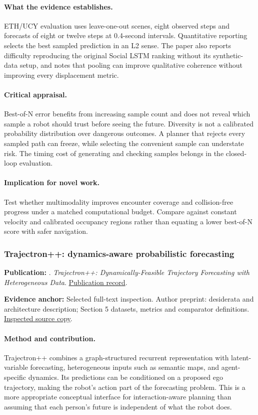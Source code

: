 \paragraph{What the evidence establishes.} ETH/UCY evaluation uses leave-one-out scenes, eight observed steps and forecasts of eight or twelve steps at 0.4-second intervals. Quantitative reporting selects the best sampled prediction in an L2 sense. The paper also reports difficulty reproducing the original Social LSTM ranking without its synthetic-data setup, and notes that pooling can improve qualitative coherence without improving every displacement metric.

\paragraph{Critical appraisal.} Best-of-N error benefits from increasing sample count and does not reveal which sample a robot should trust before seeing the future. Diversity is not a calibrated probability distribution over dangerous outcomes. A planner that rejects every sampled path can freeze, while selecting the convenient sample can understate risk. The timing cost of generating and checking samples belongs in the closed-loop evaluation.

\paragraph{Implication for novel work.} Test whether multimodality improves encounter coverage and collision-free progress under a matched computational budget. Compare against constant velocity and calibrated occupancy regions rather than equating a lower best-of-N score with safer navigation.

\subsubsection{Trajectron++: dynamics-aware probabilistic forecasting}\label{paper:trajectron}
\textbf{Publication:} \citet{trajectron}. \emph{Trajectron++: Dynamically-Feasible Trajectory Forecasting with Heterogeneous Data}. \href{https://doi.org/10.1007/978-3-030-58523-5_40}{Publication record}.

\textbf{Evidence anchor:} Selected full-text inspection. Author preprint: desiderata and architecture description; Section 5 datasets, metrics and comparator definitions. \href{https://arxiv.org/pdf/2001.03093}{Inspected source copy}.

\paragraph{Method and contribution.} Trajectron++ combines a graph-structured recurrent representation with latent-variable forecasting, heterogeneous inputs such as semantic maps, and agent-specific dynamics. Its predictions can be conditioned on a proposed ego trajectory, making the robot's action part of the forecasting problem. This is a more appropriate conceptual interface for interaction-aware planning than assuming that each person's future is independent of what the robot does.

